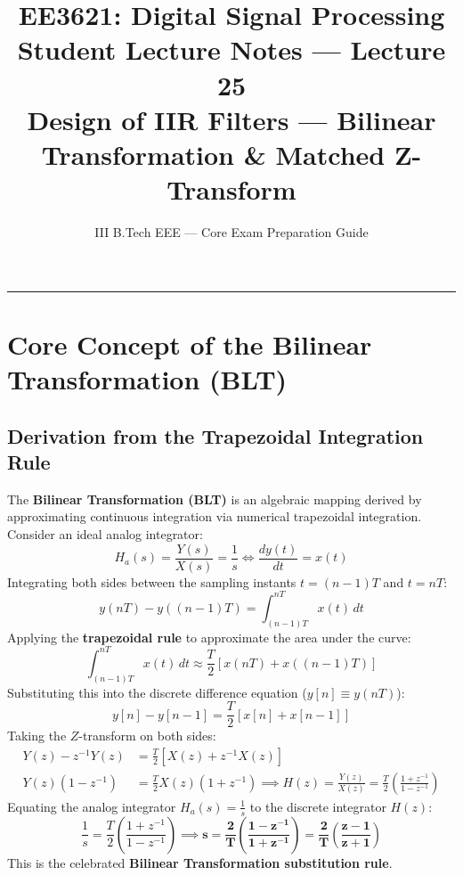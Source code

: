 \documentclass[11pt,a4paper]{article}
\title{\textbf{EE3621: Digital Signal Processing} \\ \Large Student Lecture Notes — Lecture 25 \\ \large Design of IIR Filters — Bilinear Transformation \& Matched Z-Transform}
\author{III B.Tech EEE — Core Exam Preparation Guide}
\date{}
\begin{document}
\maketitle

\noindent\rule{\textwidth}{0.5pt}

\section{Core Concept of the Bilinear Transformation (BLT)}

\subsection{Derivation from the Trapezoidal Integration Rule}
The \textbf{Bilinear Transformation (BLT)} is an algebraic mapping derived by approximating continuous integration via numerical trapezoidal integration. Consider an ideal analog integrator:
\begin{equation}
H_a(s) = \frac{Y(s)}{X(s)} = \frac{1}{s} \iff \frac{dy(t)}{dt} = x(t)
\end{equation}
Integrating both sides between the sampling instants $t = (n-1)T$ and $t = nT$:
\begin{equation}
y(nT) - y((n-1)T) = \int_{(n-1)T}^{nT} x(t) \, dt
\end{equation}
Applying the \textbf{trapezoidal rule} to approximate the area under the curve:
\begin{equation}
\int_{(n-1)T}^{nT} x(t) \, dt \approx \frac{T}{2} [x(nT) + x((n-1)T)]
\end{equation}
Substituting this into the discrete difference equation ($y[n] \equiv y(nT)$):
\begin{equation}
y[n] - y[n-1] = \frac{T}{2} [x[n] + x[n-1]]
\end{equation}
Taking the $Z$-transform on both sides:
\begin{align}
Y(z) - z^{-1} Y(z) &= \frac{T}{2} [X(z) + z^{-1} X(z)] \nonumber \\
Y(z)(1 - z^{-1}) &= \frac{T}{2} X(z)(1 + z^{-1}) \implies H(z) = \frac{Y(z)}{X(z)} = \frac{T}{2} \left(\frac{1 + z^{-1}}{1 - z^{-1}}\right)
\end{align}
Equating the analog integrator $H_a(s) = \frac{1}{s}$ to the discrete integrator $H(z)$:
\begin{equation}
\frac{1}{s} = \frac{T}{2} \left(\frac{1 + z^{-1}}{1 - z^{-1}}\right) \implies \mathbf{s = \frac{2}{T} \left( \frac{1 - z^{-1}}{1 + z^{-1}} \right) = \frac{2}{T} \left( \frac{z - 1}{z + 1} \right)}
\label{eq:blt_formula}
\end{equation}
This is the celebrated \textbf{Bilinear Transformation substitution rule}.
\end{document}
